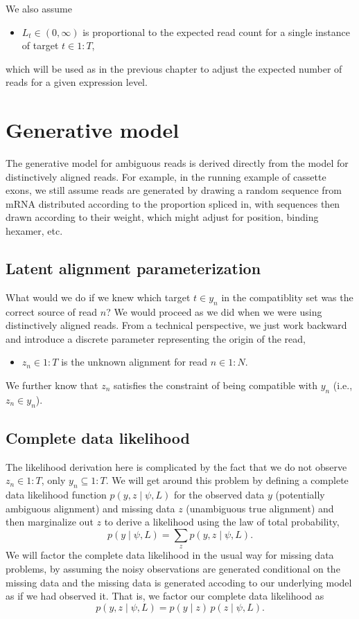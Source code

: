 \documentclass[11pt]{report}
\newcommand{\rngto}[1]{1{:}#1}
\newcommand{\anitem}[1]{\begin{itemize} \item #1 \end{itemize}}
\begin{document}
We also assume
%
\anitem{$L_t \in (0, \infty)$ is proportional to the expected read count for
  a single instance of target $t \in \rngto{T}$,}
%
which will be used as in the previous chapter to
adjust the expected number of reads for a given expression level.


\section{Generative model}

The generative model for ambiguous reads is derived directly from the
model for distinctively aligned reads.  For example, in the running
example of cassette exons, we still assume reads are generated by
drawing a random sequence from mRNA distributed according to the
proportion spliced in, with sequences then drawn
according to their weight, which might adjust for position, binding
hexamer, etc.

\subsection{Latent alignment parameterization}

What would we do if we knew which target $t \in y_n$ in the
compatiblity set was the correct source of read $n$?  We would
proceed as we did when we were using distinctively aligned reads.
From a technical perspective, we just work backward and introduce a
discrete parameter representing the origin of the read,
%
\anitem{$z_n \in \rngto{T}$ is the unknown alignment for read $n \in \rngto{N}$.}
%
We further know that $z_n$ satisfies the constraint of being
compatible with $y_n$ (i.e., $z_n \in y_n$).  


\subsection{Complete data likelihood}

The likelihood derivation here is complicated by the fact that we do
not observe $z_n \in \rngto{T}$, only $y_n \subseteq \rngto{T}$.  We
will get around this problem by defining a complete data likelihood
function $p(y, z \mid \psi, L)$ for the observed data $y$ (potentially
ambiguous alignment) and missing data $z$ (unambiguous true alignment)
and then marginalize out $z$ to derive a likelihood using the law of
total probability,
\[
  p(y \mid \psi, L) = \sum_z p(y, z \mid \psi, L).
\]
We will factor the complete data likelihood in the usual way for
missing data problems, by assuming the noisy observations are 
generated conditional on the missing data and the missing data is
generated accoding to our underlying model as if we had observed it.
That is, we factor our complete data likelihood as 
\[
  p(y, z \mid \psi, L) = p(y \mid z) \, p(z \mid \psi, L).
\]
\end{document}
